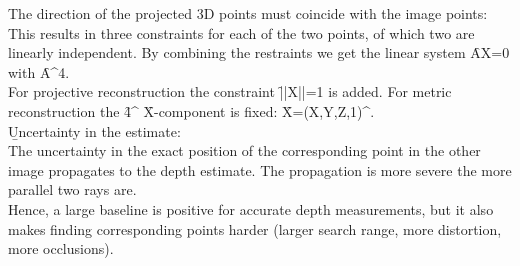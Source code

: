 The direction of the projected 3D points must coincide with the image points:
This results in three constraints for each of the two points, of which two are linearly independent. By combining the restraints we get the linear system \f{AX=0} with \f{A\in{}^{4}}.\\
For projective reconstruction the constraint \f{||X||=1} is added. For metric reconstruction the \f{4^{}} \f{X}-component is fixed: \f{X=(X,Y,Z,1)^\top}.\\

\b{Uncertainty in the estimate:\\[0.5em]}
The uncertainty in the exact position of the corresponding point in the other image propagates to the depth estimate. The propagation is more severe the more parallel two rays are.\\
Hence, a large baseline is positive for accurate depth measurements, but it also makes finding corresponding points harder (larger search range, more distortion, more occlusions).
\newpage